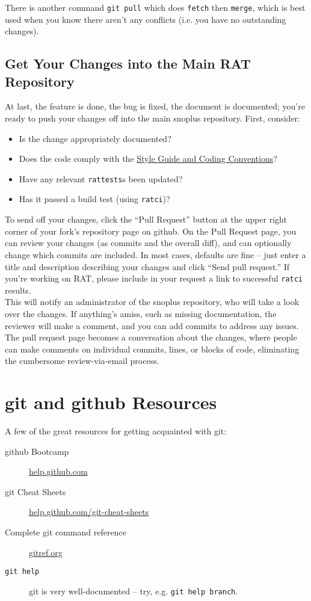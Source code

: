 \documentclass{article}
\begin{document}
There is another command {\tt git pull} which does {\tt fetch} then {\tt merge}, which is best used when you know there aren't any conflicts (i.e. you have no outstanding changes).

\subsection{Get Your Changes into the Main RAT Repository}
At last, the feature is done, the bug is fixed, the document is documented; you're ready to push your changes off into the main snoplus repository. First, consider:
\begin{itemize}
\item Is the change appropriately documented?
\item Does the code comply with the \href{https://www.snolab.ca/snoplus/private/DocDB/cgi/ShowDocument?docid=1018}{Style Guide and Coding Conventions}?
\item Have any relevant {\tt rattests}s been updated?
\item Has it passed a build test (using {\tt ratci})?
\end{itemize}

To send off your changes, click the ``Pull Request'' button at the upper right corner of your fork's repository page on github. On the Pull Request page, you can review your changes (as commits and the overall diff), and can optionally change which commits are included. In most cases, defaults are fine -- just enter a title and description describing your changes and click ``Send pull request.'' If you're working on RAT, please include in your request a link to successful {\tt ratci} results.\\

This will notify an administrator of the snoplus repository, who will take a look over the changes. If anything's amiss, such as missing documentation, the reviewer will make a comment, and you can add commits to address any issues. The pull request page becomes a conversation about the changes, where people can make comments on individual commits, lines, or blocks of code, eliminating the cumbersome review-via-email process.

\section{git and github Resources}
A few of the great resources for getting acquainted with git:
\begin{description}
\item[github Bootcamp] \href{http://help.github.com}{help.github.com}
\item[git Cheat Sheets] \href{http://help.github.com/git-cheat-sheets}{help.github.com/git-cheat-sheets}
\item[Complete git command reference] \href{http://gitref.org}{gitref.org}
\item[{\tt git help}] git is very well-documented -- try, e.g. {\tt git help branch}.
\end{description}


\end{document}
